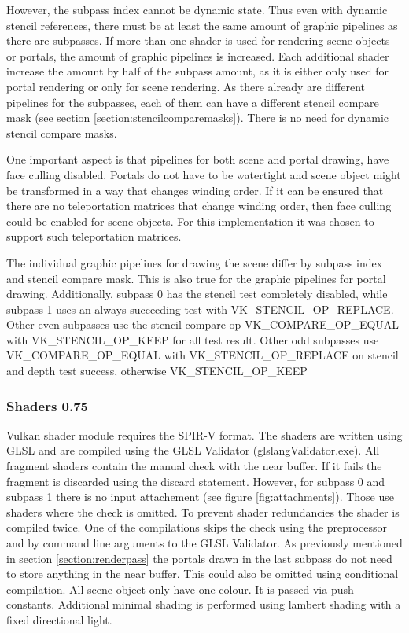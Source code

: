 However, the subpass index cannot be dynamic state. Thus even with dynamic stencil references, there must be at least the same amount of graphic pipelines as there are subpasses. If more than one shader is used for rendering scene objects or portals, the amount of graphic pipelines is increased. Each additional shader increase the amount by half of the subpass amount, as it is either only used for portal rendering or only for scene rendering. As there already are different pipelines for the subpasses, each of them can have a different stencil compare mask (see section \ref{section:stencilcomparemasks}). There is no need for dynamic stencil compare masks.

One important aspect is that pipelines for both scene and portal drawing, have face culling disabled. Portals do not have to be watertight and scene object might be transformed in a way that changes winding order. If it can be ensured that there are no teleportation matrices that change winding order, then face culling could be enabled for scene objects. For this implementation it was chosen to support such teleportation matrices.

The individual  graphic pipelines for drawing the scene differ by subpass index and stencil compare mask. This is also true for the graphic pipelines for portal drawing. Additionally, subpass 0 has the stencil test completely disabled, while subpass 1 uses an always succeeding test with VK\_STENCIL\_OP\_REPLACE. Other even subpasses use the stencil compare op VK\_COMPARE\_OP\_EQUAL with VK\_STENCIL\_OP\_KEEP for all test result. Other odd subpasses use VK\_COMPARE\_OP\_EQUAL with VK\_STENCIL\_OP\_REPLACE on stencil and depth test success, otherwise VK\_STENCIL\_OP\_KEEP

\subsubsection{Shaders 0.75}
Vulkan shader module requires the SPIR-V format. The shaders are written using GLSL and are compiled using the GLSL Validator (glslangValidator.exe). All fragment shaders contain the manual check with the near buffer. If it fails the fragment is discarded using the discard statement. However, for subpass 0 and subpass 1 there is no input attachement (see figure \ref{fig:attachments}). Those use shaders where the check is omitted. To prevent shader redundancies the shader is compiled twice. One of the compilations skips the check using the preprocessor and by command line arguments to the GLSL Validator. As previously mentioned in section \ref{section:renderpass} the portals drawn in the last subpass do not need to store anything in the near buffer. This could also be omitted using conditional compilation. All scene object only have one colour. It is passed via push constants. Additional minimal shading is performed using lambert shading with a fixed directional light.

